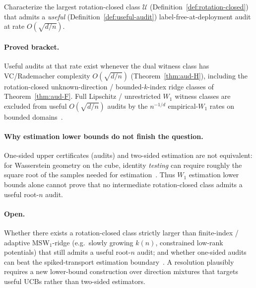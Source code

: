 \begin{conjecture}\label{conj:aud-maximal}
Characterize the largest rotation-closed class $\mathcal U$
(Definition~\ref{def:rotation-closed}) that admits a \emph{useful}
(Definition~\ref{def:useful-audit}) label-free-at-deployment audit at rate
$O(\sqrt{d/n})$.
\paragraph{Proved bracket.} Useful audits at that rate exist whenever the dual witness class
has VC/Rademacher complexity $O(\sqrt{d/n})$ (Theorem~\ref{thm:aud-H}), including the
rotation-closed unknown-direction / bounded-$k$-index ridge classes of
Theorem~\ref{thm:aud-F}. Full Lipschitz / unrestricted $W_1$ witness classes are excluded from
useful $O(\sqrt{d/n})$ audits by the $n^{-1/d}$ empirical-$W_1$ rates on bounded
domains~\cite{fournier2015rate,weed2019sharp}.
\paragraph{Why estimation lower bounds do not finish the question.}
One-sided upper certificates (audits) and two-sided estimation are not equivalent: for
Wasserstein geometry on the cube, identity \emph{testing} can require roughly the square root of
the samples needed for estimation~\cite{deng2017wasserstein}. Thus $W_1$ estimation lower
bounds alone cannot prove that no intermediate rotation-closed class admits a useful root-$n$
audit.
\paragraph{Open.} Whether there exists a rotation-closed class strictly larger than
finite-index / adaptive MSW$_1$-ridge (e.g.\ slowly growing $k(n)$, constrained low-rank
potentials) that still admits a useful root-$n$ audit; and whether one-sided audits can beat
the spiked-transport estimation boundary~\cite{niles2019estimation}. A resolution plausibly
requires a new lower-bound construction over direction mixtures that targets useful UCBs
rather than two-sided estimators.
\end{conjecture}

